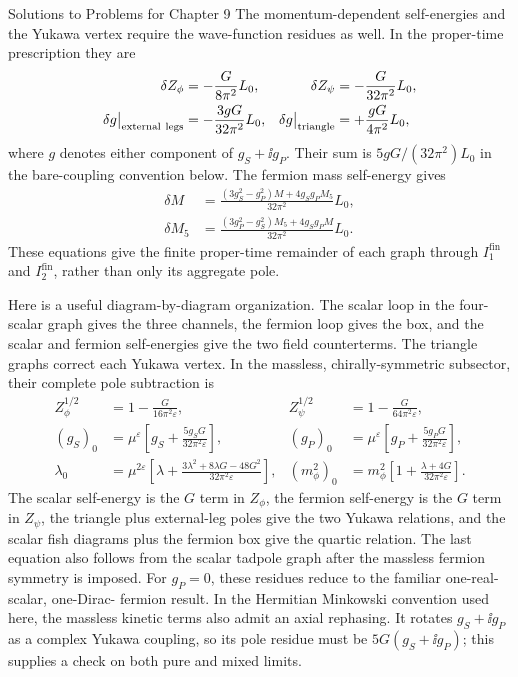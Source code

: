 \begin{bankssolutions}{Solutions to Problems for Chapter 9}
The momentum-dependent self-energies and the Yukawa vertex require the
wave-function residues as well.  In the proper-time prescription they are
\begin{align*}
 \delta Z_\phi&=-\frac{G}{8\pi^2}L_0,
 &\delta Z_\psi&=-\frac{G}{32\pi^2}L_0,\\
 \delta g\big|_{\rm external\ legs}&=-\frac{3gG}{32\pi^2}L_0,
 &\delta g\big|_{\rm triangle}&=+\frac{gG}{4\pi^2}L_0,
\end{align*}
where $g$ denotes either component of $g_S+\ii g_P$.  Their sum is
$5gG/(32\pi^2)L_0$ in the bare-coupling convention below.  The fermion
mass self-energy gives
\begin{align*}
 \delta M&=\frac{(3g_S^2-g_P^2)M+4g_Sg_PM_5}{32\pi^2}L_0,\\
 \delta M_5&=\frac{(3g_P^2-g_S^2)M_5+4g_Sg_PM}{32\pi^2}L_0.
\end{align*}
These equations give the finite proper-time remainder of each graph through
$I_1^{\mathrm{fin}}$ and $I_2^{\mathrm{fin}}$, rather than only its
aggregate pole.

Here is a useful diagram-by-diagram organization.  The scalar loop in the
four-scalar graph gives the three channels, the fermion loop gives the box,
and the scalar and fermion self-energies give the two field counterterms.
The triangle graphs correct each Yukawa vertex.  In the massless,
chirally-symmetric subsector, their complete pole subtraction is
\begin{align}
 Z_\phi^{1/2}&=1-\frac{G}{16\pi^2\varepsilon},
 &Z_\psi^{1/2}&=1-\frac{G}{64\pi^2\varepsilon}, \label{eq:9.2-sol-fields}\\
 (g_S)_0&=\mu^\varepsilon\left[g_S+
 \frac{5g_SG}{32\pi^2\varepsilon}\right],
 & (g_P)_0&=\mu^\varepsilon\left[g_P+
 \frac{5g_PG}{32\pi^2\varepsilon}\right], \label{eq:9.2-sol-yukawa}\\
 \lambda_0&=\mu^{2\varepsilon}\left[\lambda+
 \frac{3\lambda^2+8\lambda G-48G^2}{32\pi^2\varepsilon}\right],
 & (m_\phi^2)_0&=m_\phi^2\left[1+
 \frac{\lambda+4G}{32\pi^2\varepsilon}\right]. \label{eq:9.2-sol-poles}
\end{align}
The scalar self-energy is the $G$ term in $Z_\phi$, the fermion self-energy
is the $G$ term in $Z_\psi$, the triangle plus external-leg poles give
the two Yukawa relations, and the scalar fish diagrams plus the fermion box
give the quartic relation.  The last equation also follows from the scalar
tadpole graph after the massless fermion symmetry is imposed.  For
$g_P=0$, these residues reduce to the familiar one-real-scalar, one-Dirac-
fermion result.  In the Hermitian Minkowski convention used here, the
massless kinetic terms also admit an axial rephasing.  It rotates
$g_S+\ii g_P$ as a complex Yukawa coupling, so its pole residue must be
$5G(g_S+\ii g_P)$; this supplies a check on both pure and mixed limits.


\end{bankssolutions}
